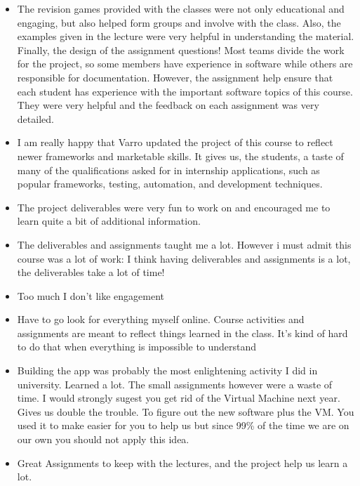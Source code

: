 \begin{itemize}[leftmargin=0.5cm]
\item The revision games provided with the classes were not only educational and engaging, but also helped form groups and involve with the class. Also, the examples given in the lecture were very helpful in understanding the material. Finally, the design of the assignment questions! Most teams divide the work for the project, so some members have experience in software while others are responsible for documentation. However, the assignment help ensure that each student has experience with the important software topics of this course. They were very helpful and the feedback on each assignment was very detailed. 

\item I am really happy that Varro updated the project of this course to reflect newer frameworks and marketable skills. It gives us, the students, a taste of many of the qualifications asked for in internship applications, such as popular frameworks, testing, automation, and development techniques. 


\item The project deliverables were very fun to work on and encouraged me to learn quite a bit of additional information. 

\item The deliverables and assignments taught me a lot. However i must admit this course was a lot of work: I think having deliverables and assignments is a lot, the deliverables take a lot of time! 

\item Too much I don't like engagement 

\item Have to go look for everything myself online. Course activities and assignments are meant to reflect things learned in the class. It's kind of hard to do that when everything is impossible to understand 

\item Building the app was probably the most enlightening activity I did in university. Learned a lot. The small assignments however were a waste of time. I would strongly sugest you get rid of the Virtual Machine next year. Gives us double the trouble. To figure out the new software plus the VM. You used it to make easier for you to help us but since 99\% of the time we are on our own you should not apply this idea.

\item Great Assignments to keep with the lectures, and the project help us learn a lot. 


\end{itemize}
